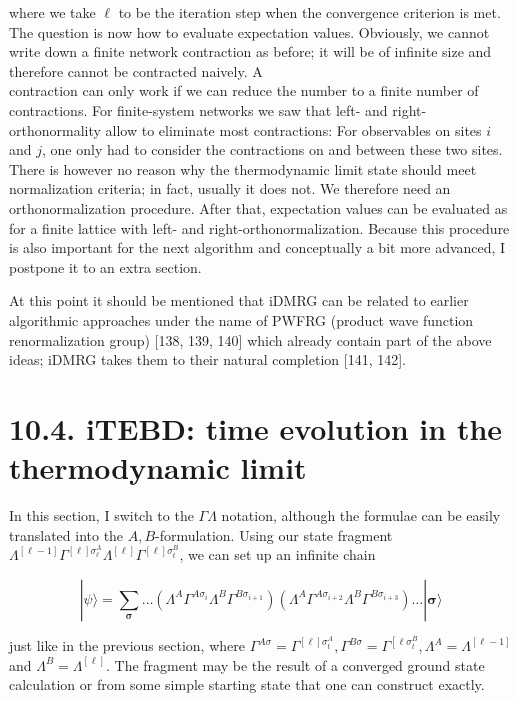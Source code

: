 \documentclass[12pt]{article}
\begin{document}
where we take $\ell$ to be the iteration step when the convergence criterion is met. The question is now how to evaluate expectation values. Obviously, we cannot write down a finite network contraction as before; it will be of infinite size and therefore cannot be contracted naively. A\\
contraction can only work if we can reduce the number to a finite number of contractions. For finite-system networks we saw that left- and right-orthonormality allow to eliminate most contractions: For observables on sites $i$ and $j$, one only had to consider the contractions on and between these two sites. There is however no reason why the thermodynamic limit state should meet normalization criteria; in fact, usually it does not. We therefore need an orthonormalization procedure. After that, expectation values can be evaluated as for a finite lattice with left- and right-orthonormalization. Because this procedure is also important for the next algorithm and conceptually a bit more advanced, I postpone it to an extra section.

At this point it should be mentioned that iDMRG can be related to earlier algorithmic approaches under the name of PWFRG (product wave function renormalization group) [138, 139, 140] which already contain part of the above ideas; iDMRG takes them to their natural completion [141, 142].

\section*{10.4. iTEBD: time evolution in the thermodynamic limit}
In this section, I switch to the $\Gamma \Lambda$ notation, although the formulae can be easily translated into the $A, B$-formulation. Using our state fragment $\Lambda^{[\ell-1]} \Gamma^{[\ell] \sigma_{\ell}^{A}} \Lambda^{[\ell]} \Gamma^{[\ell] \sigma_{t}^{B}}$, we can set up an infinite chain


\begin{equation*}
|\psi\rangle=\sum_{\boldsymbol{\sigma}} \ldots\left(\Lambda^{A} \Gamma^{A \sigma_{i}} \Lambda^{B} \Gamma^{B \sigma_{i+1}}\right)\left(\Lambda^{A} \Gamma^{A \sigma_{i+2}} \Lambda^{B} \Gamma^{B \sigma_{i+3}}\right) \ldots|\boldsymbol{\sigma}\rangle \tag{344}
\end{equation*}


just like in the previous section, where $\Gamma^{A \sigma}=\Gamma^{[\ell] \sigma_{t}^{A}}, \Gamma^{B \sigma}=\Gamma^{\left[\ell \sigma_{t}^{B}\right.}, \Lambda^{A}=\Lambda^{[\ell-1]}$ and $\Lambda^{B}=\Lambda^{[\ell]}$. The fragment may be the result of a converged ground state calculation or from some simple starting state that one can construct exactly.
\end{document}
